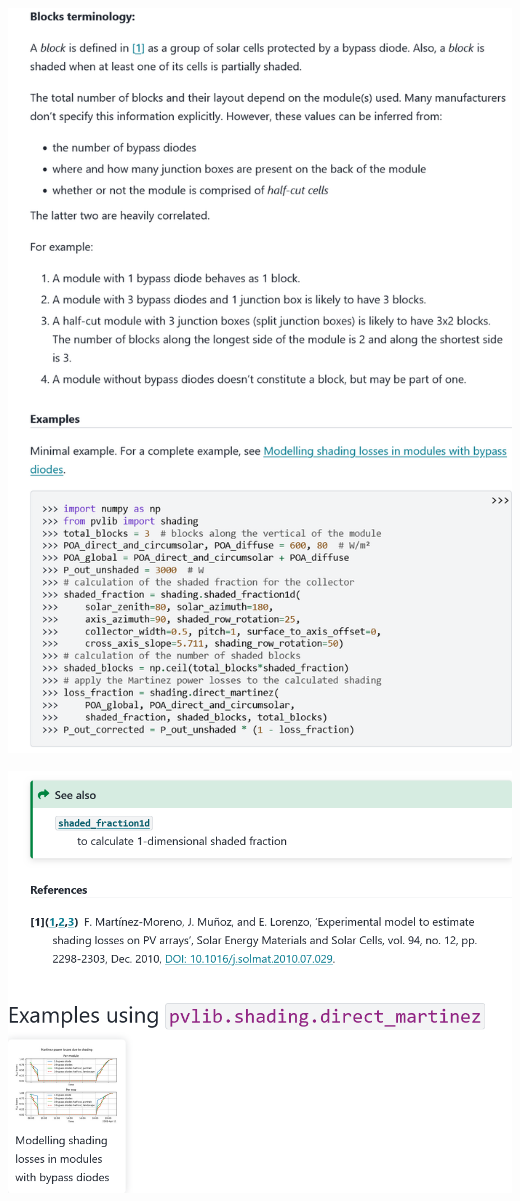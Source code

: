 \begin{myparindent}{0pt}
\includegraphics[width=\linewidth,height=0.9\textheight,keepaspectratio]{images/docs_funcs_cut/direct_martinez_1.png}

\includegraphics[width=\linewidth,height=0.9\textheight,keepaspectratio]{images/docs_funcs_cut/direct_martinez_2.png}


\end{myparindent}
